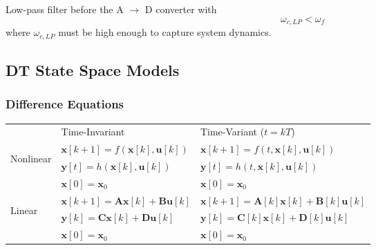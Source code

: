 
Low-pass filter before the A $\rightarrow$ D converter with
\begin{equation*}
    \omega_{c,LP} < \omega_f
\end{equation*}
where $\omega_{c,LP}$ must be high enough to capture system dynamics.

\subsection{DT State Space Models}
\subsubsection{Difference Equations}

\renewcommand{\arraystretch}{1.3}
\setlength{\oldtabcolsep}{\tabcolsep}\setlength\tabcolsep{3pt}

\begin{tabularx}{\linewidth}{@{}lll@{}}
                                                             & Time-Invariant                                     & Time-Variant ($t = kT$)                                                   \\
    \cmidrule{2-3}
    \multirow{3}{*}{\begin{sideways}Nonlinear\end{sideways}} & $\mathbf{x}[k+1] = f(\mathbf{x}[k],\mathbf{u}[k])$ & $\mathbf{x}[k+1] = f(t,\mathbf{x}[k],\mathbf{u}[k])$                      \\
                                                             & $\mathbf{y}[t] = h(\mathbf{x}[k],\mathbf{u}[k])$   & $\mathbf{y}[t] = h(t,\mathbf{x}[k],\mathbf{u}[k])$                        \\
                                                             & $\mathbf{x}[0]=\mathbf{x}_0$                       & $\mathbf{x}[0]=\mathbf{x}_0$                                              \\
    \cmidrule{2-3}
    \multirow{3}{*}{\begin{sideways}Linear\end{sideways}}    & $\mathbf{x}[k+1] = \mathbf{Ax}[k]+\mathbf{Bu}[k]$  & $\mathbf{x}[k+1] = \mathbf{A}[k]\mathbf{x}[k]+\mathbf{B}[k]\mathbf{u}[k]$ \\
                                                             & $\mathbf{y}[k] = \mathbf{Cx}[k]+\mathbf{Du}[k]$    & $\mathbf{y}[k] = \mathbf{C}[k]\mathbf{x}[k]+\mathbf{D}[k]\mathbf{u}[k]$   \\
                                                             & $\mathbf{x}[0] = \mathbf{x}_0$                     & $\mathbf{x}[0]=\mathbf{x}_0$
\end{tabularx}

